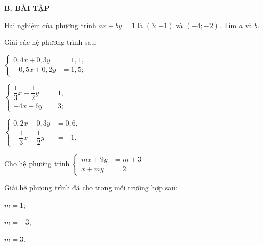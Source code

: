 \begin{practice}
    \textbf{B. BÀI TẬP}

    \begin{questions}[resume=SBT]
        \item Hai nghiệm của phương trình $ax+by=1$ là $(3;-1)$ và $(-4;-2)$. Tìm $a$ và $b$.

        \answerline
        \answerline

        \item Giải các hệ phương trình sau:
        \begin{questions}
            \item $\left\{
                \begin{aligned}
                    0{,}4x+0{,}3y&=1{,}1,\\
                    -0{,}5x+0{,}2y&=1{,}5;
                \end{aligned}
                \right.$

            \answerline
            \answerline

            \item $\left\{
                \begin{aligned}
                    \dfrac{1}{3}x-\dfrac{1}{2}y&=1,\\
                    -4x+6y&=3;
                \end{aligned}
                \right.$

            \answerline
            \answerline

            \item $\left\{
                \begin{aligned}
                    0{,}2x-0{,}3y&=0{,}6,\\
                    -\dfrac{1}{3}x+\dfrac{1}{2}y&=-1.
                \end{aligned}
                \right.$

            \answerline
            \answerline
        \end{questions}

        \item Cho hệ phương trình $\left\{\begin{aligned}mx+9y&=m+3\\x+my&=2.\end{aligned}\right.$

        Giải hệ phương trình đã cho trong mỗi trường hợp sau:
        \begin{questions}
            \item $m=1$;
            \item $m=-3$;
            \item $m=3$.
        \end{questions}


\end{questions}
\end{practice}
